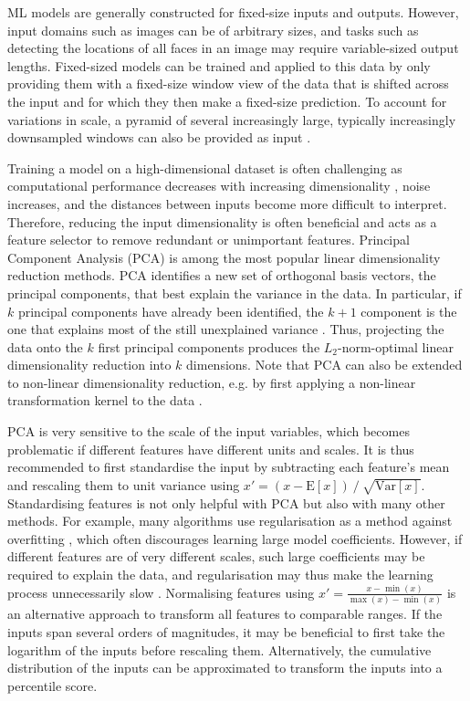 \newpar ML models are generally constructed for fixed-size inputs and outputs. However, input domains such as images can be of arbitrary sizes, and tasks such as detecting the locations of all faces in an image may require variable-sized output lengths. Fixed-sized models can be trained and applied to this data by only providing them with a fixed-size window view of the data that is shifted across the input and for which they then make a fixed-size prediction. To account for variations in scale, a pyramid of several increasingly large, typically increasingly downsampled windows can also be provided as input \cite{feature-pyramid-1984}.

Training a model on a high-dimensional dataset is often challenging as computational performance decreases with increasing dimensionality \cite{ml-pattern-2006}, noise increases, and the distances between inputs become more difficult to interpret. Therefore, reducing the input dimensionality is often beneficial and acts as a feature selector to remove redundant or unimportant features. Principal Component Analysis (PCA) is among the most popular linear dimensionality reduction methods. PCA identifies a new set of orthogonal basis vectors, the principal components, that best explain the variance in the data. In particular, if $k$ principal components have already been identified, the $k+1$ component is the one that explains most of the still unexplained variance \cite{pca-1901}. Thus, projecting the data onto the $k$ first principal components produces the $L_2$-norm-optimal linear dimensionality reduction into $k$ dimensions. Note that PCA can also be extended to non-linear dimensionality reduction, e.g. by first applying a non-linear transformation kernel to the data \cite{kernel-pca-1997}.

PCA is very sensitive to the scale of the input variables, which becomes problematic if different features have different units and scales. It is thus recommended to first standardise the input by subtracting each feature's mean and rescaling them to unit variance using $x' = (x - \text{E}[x]) \mathbin{/} \sqrt{\text{Var}[x]}$. Standardising features is not only helpful with PCA but also with many other methods. For example, many algorithms use regularisation as a method against overfitting \cite{statistical-learning-2009}, which often discourages learning large model coefficients. However, if different features are of very different scales, such large coefficients may be required to explain the data, and regularisation may thus make the learning process unnecessarily slow \cite{data-preprocessing-2007}. Normalising features using $x' = \frac{x - \min(x)}{\max(x) - \min(x)}$ is an alternative approach to transform all features to comparable ranges. If the inputs span several orders of magnitudes, it may be beneficial to first take the logarithm of the inputs before rescaling them. Alternatively, the cumulative distribution of the inputs can be approximated to transform the inputs into a percentile score.

